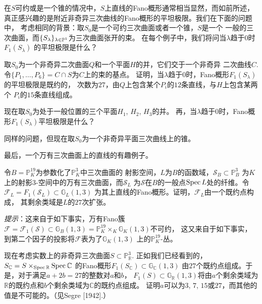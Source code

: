 在$S$可约或是一个锥的情况中，$S$上直线的Fano概形通常相当显然，而如前所述，
真正感兴趣的是附近非奇异三次曲线的Fano概形的平坦极限。我们在下面的问题中，
考虑相同的背景：取$S_0$是一个可约三次曲面或者一个锥，$S$是一个
一般的三次曲面，而$\{S_\lambda\}_{\lambda\in \P^1}$为三次曲面张开的束。
在每个例子中，我们将问当$\lambda$趋于$0$时$F_1(S_\lambda)$
的平坦极限是什么？

\begin{exe}\label{exe:4.78}
取$S_0$为一个非奇异二次曲面$Q$和一个平面$H$的并，它们交于一个非奇异
二次曲线$C$. 令$\{P_1,\dots,P_6\}=C\cap S$为$C$上的束的基点。
证明，当$\lambda$趋于$0$时，Fano概形$F_1(S_\lambda)$的平坦极限是既约的，
次数为$27$，由$Q$上包含某个$P_i$的$12$条直线，与$H$上包含某两个
$P_i$的$15$条直线组成。
\end{exe}

\begin{exe}\label{exe:4.79}
现在取$S_0$为处于一般位置的三个平面$H_1$, $H_2$, $H_3$的并。 
再，当$\lambda$趋于$0$时，Fano概形$F_1(S_\lambda)$平坦极限是什么？
\end{exe}

\begin{exe}\label{exe:4.80}
同样的问题，但现在取$S_0$为一个非奇异平面三次曲线上的锥。
\end{exe}

最后，一个万有三次曲面上的直线的有趣例子。

\begin{exe}\label{exe:4.81}
令$B=\mathbb{P}_{K}^{19}$为参数化了$\mathbb{P}_{K}^{3}$中三次曲面的
射影空间，$L$为$B$的函数域，$\mathscr{S}_{B} \subset \mathbb{P}_{B}^{3}$
为$K$上的射影$3$-空间中的万有三次曲面，而$\mathscr{S}_{L}$
为$\mathscr{S}$在$B$的一般点$\spec L$处的纤维。令
$\mathscr{F}_{L}=F_{1}\left(\mathscr{S}_{L}\right) \subset \mathbb{G}_{L}(1,3)$ 
为其上直线的Fano概形。证明，$\mathscr{F}_{L}$由一个既约点构成，
其剩余类域是$L$的$27$次扩张。

\emph{提示}：这来自于如下事实，万有Fano簇$\mathscr{F}=\mathscr{F}_{1}(\mathscr{S}) \subset \mathbb{G}_{B}(1,3)=\mathbb{P}_{K}^{19} \times_{K} \mathbb{G}_{K}(1,3)$不可约，
这又来自于如下事实，到第二个因子的投影将$\mathscr F$表为了$\mathbb{G}_{K}(1,3)$
上的$\mathbb{P}_{K}^{19}$-丛。
\end{exe}


\begin{exe}\label{exe:4.82}
现在考虑实数上的非奇异三次曲面$S \subset \mathbb{P}_{\mathbb{R}}^{3}$. 
正如我们已经看到的，$S_{\mathbb{C}}=S \times_{\spec \mathbb{R}}\spec \mathbb{C}$ 
的Fano概形$F_{1}\left(S_{\mathbb{C}}\right) \subset \mathbb{G}_{\mathbb{C}}(1,3)$
由$27$个既约点组成。于是，对于满足$a+2 b=27$的整数对$a$和$b$，
$F_{1}(S) \subset \mathbb{G}_{\mathbb{R}}(1,3)$将由$a$个剩余类域为
$\mathbb{R}$的既约点和$b$个剩余类域为$\mathbb{C}$的既约点组成。
证明$a$可以为$3$, $7$, $15$或$27$，而其他的值是不可能的。（见Segre [1942].）
\end{exe}